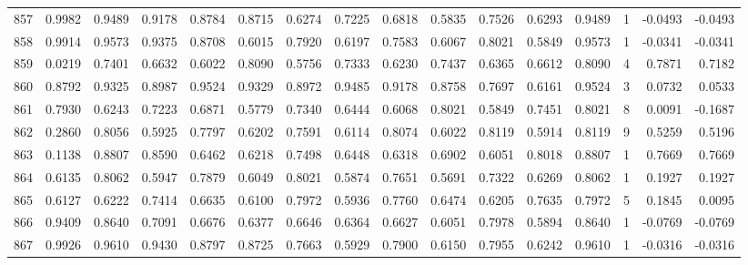 \begin{tabular}{lrrrrrrrrrrrrrrr}
857 &      0.9982 &  0.9489 &  0.9178 &  0.8784 &  0.8715 &  0.6274 &  0.7225 &  0.6818 &  0.5835 &  0.7526 &   0.6293 &     0.9489 &      1 &                   -0.0493 &                    -0.0493 \\
858 &      0.9914 &  0.9573 &  0.9375 &  0.8708 &  0.6015 &  0.7920 &  0.6197 &  0.7583 &  0.6067 &  0.8021 &   0.5849 &     0.9573 &      1 &                   -0.0341 &                    -0.0341 \\
859 &      0.0219 &  0.7401 &  0.6632 &  0.6022 &  0.8090 &  0.5756 &  0.7333 &  0.6230 &  0.7437 &  0.6365 &   0.6612 &     0.8090 &      4 &                    0.7871 &                     0.7182 \\
860 &      0.8792 &  0.9325 &  0.8987 &  0.9524 &  0.9329 &  0.8972 &  0.9485 &  0.9178 &  0.8758 &  0.7697 &   0.6161 &     0.9524 &      3 &                    0.0732 &                     0.0533 \\
861 &      0.7930 &  0.6243 &  0.7223 &  0.6871 &  0.5779 &  0.7340 &  0.6444 &  0.6068 &  0.8021 &  0.5849 &   0.7451 &     0.8021 &      8 &                    0.0091 &                    -0.1687 \\
862 &      0.2860 &  0.8056 &  0.5925 &  0.7797 &  0.6202 &  0.7591 &  0.6114 &  0.8074 &  0.6022 &  0.8119 &   0.5914 &     0.8119 &      9 &                    0.5259 &                     0.5196 \\
863 &      0.1138 &  0.8807 &  0.8590 &  0.6462 &  0.6218 &  0.7498 &  0.6448 &  0.6318 &  0.6902 &  0.6051 &   0.8018 &     0.8807 &      1 &                    0.7669 &                     0.7669 \\
864 &      0.6135 &  0.8062 &  0.5947 &  0.7879 &  0.6049 &  0.8021 &  0.5874 &  0.7651 &  0.5691 &  0.7322 &   0.6269 &     0.8062 &      1 &                    0.1927 &                     0.1927 \\
865 &      0.6127 &  0.6222 &  0.7414 &  0.6635 &  0.6100 &  0.7972 &  0.5936 &  0.7760 &  0.6474 &  0.6205 &   0.7635 &     0.7972 &      5 &                    0.1845 &                     0.0095 \\
866 &      0.9409 &  0.8640 &  0.7091 &  0.6676 &  0.6377 &  0.6646 &  0.6364 &  0.6627 &  0.6051 &  0.7978 &   0.5894 &     0.8640 &      1 &                   -0.0769 &                    -0.0769 \\
867 &      0.9926 &  0.9610 &  0.9430 &  0.8797 &  0.8725 &  0.7663 &  0.5929 &  0.7900 &  0.6150 &  0.7955 &   0.6242 &     0.9610 &      1 &                   -0.0316 &                    -0.0316 \\

\end{tabular}
